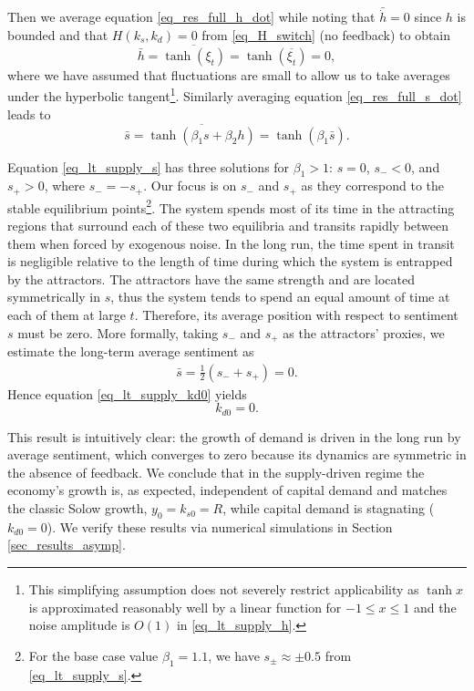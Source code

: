 Then we average equation \eqref{eq_res_full_h_dot} while noting that $\bar{\dot{h}}=0$ since $h$ is bounded and that $H(k_s,k_d)=0$ from \eqref{eq_H_switch} (no feedback) to obtain
\begin{equation}\label{eq_lt_supply_h}
	\bar{h} = \overline{\tanh\left(\xi_t\right)} = \tanh\left(\overline{\xi_t}\right) = 0,
\end{equation}
where we have assumed that fluctuations are small to allow us to take averages under the hyperbolic tangent\footnote{This simplifying assumption does not severely restrict applicability as $\tanh{x}$ is approximated reasonably well by a linear function for $-1{\leq}x{\leq}1$ and the noise amplitude is $O(1)$ in \eqref{eq_lt_supply_h}.}. Similarly averaging equation \eqref{eq_res_full_s_dot} leads to
\begin{equation}\label{eq_lt_supply_s}
	\bar{s} = \overline{\tanh\left(\beta_1 s + \beta_2 h\right)} = \tanh\left(\beta_1 \bar{s}\right).
\end{equation}

Equation \eqref{eq_lt_supply_s} has three solutions for $\beta_1>1$: $s=0$, $s_{-}<0$, and $s_{+}>0$, where $s_{-}=-s_{+}$. Our focus is on $s_{-}$ and $s_{+}$ as they correspond to the stable equilibrium points\footnote{For the base case value $\beta_1=1.1$, we have $s_{\pm}\approx\pm 0.5$ from \eqref{eq_lt_supply_s}.}. The system spends most of its time in the attracting regions that surround each of these two equilibria and transits rapidly between them when forced by exogenous noise. In the long run, the time spent in transit is negligible relative to the length of time during which the system is entrapped by the attractors. The attractors have the same strength and are located symmetrically in $s$, thus the system tends to spend an equal amount of time at each of them at large $t$. Therefore, its average position with respect to sentiment $s$ must be zero. More formally, taking $s_{-}$ and $s_{+}$ as the attractors' proxies, we estimate the long-term average sentiment as
\begin{eqnarray}\label{sbar_sup_est}
	\bar{s} = \frac{1}{2}\left(s_{-}+s_{+}\right) = 0. 
\end{eqnarray}
Hence equation \eqref{eq_lt_supply_kd0} yields
\begin{equation}
	k_{d0} = 0.
\end{equation}

This result is intuitively clear: the growth of demand is driven in the long run by average sentiment, which converges to zero because its dynamics are symmetric in the absence of feedback. We conclude that in the supply-driven regime the economy's growth is, as expected, independent of capital demand and matches the classic Solow growth, $y_0=k_{s0}=R$, while capital demand is stagnating ($k_{d0}=0$). We verify these results via numerical simulations in Section \ref{sec_results_asymp}.

